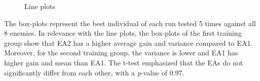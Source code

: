 \begin{figure}[H]%
	\centering
	\qquad
	\caption{Line plots}
	\label{fig:lineplots}
\end{figure}

The box-plots represent the best individual of each run tested 5 times against all 8 enemies. In relevance with the line plots, the box-plots of the first training group show that EA2 has a higher average gain and variance compared to EA1. Moreover, for the second training group, the variance is lower and EA1 has higher gain and mean than EA1. The t-test emphasized that the EAs do not significantly differ from each other, with a \textit{p}-value of 0.97.



